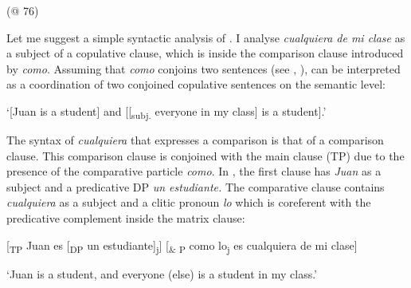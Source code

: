 {  (@ 76)
\z

Let me suggest a simple syntactic analysis of . I analyse \textit{cualquiera de mi clase} as a subject of a copulative clause, which is inside the comparison clause introduced by \textit{como}. Assuming that \textit{como} conjoins two sentences (see \citealt{Napoli1986}, \citealt{Saez1992}),  can be interpreted as a coordination of two conjoined copulative sentences on the semantic level:

\ea \label{ex:key:172} %
 ‘[Juan is a student] and [[\textsubscript{subj.} everyone in my class] is a student].’
\z

The syntax of \textit{cualquiera} that expresses a comparison is that of a {comparison clause}. This comparison clause is conjoined with the main clause (TP) due to the presence of the comparative particle \textit{como}. In , the first clause has \textit{Juan} as a subject and a predicative DP \textit{un estudiante.} The comparative clause contains \textit{cualquiera} as a subject and a clitic pronoun \textit{lo} which is coreferent with the predicative complement inside the matrix clause:

\ea \label{bkm:Ref72354100} %
[\textsubscript{TP} Juan es [\textsubscript{DP} un estudiante]\textsubscript{j}] [\textsubscript{\& P} como lo\textsubscript{j} es cualquiera de mi clase]

\glt ‘Juan is a student, and everyone (else) is a student in my class.’
\z

}
